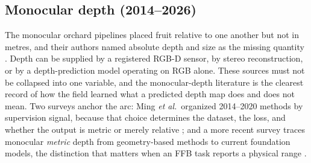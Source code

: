 \subsection{Monocular depth (2014--2026)}

The monocular orchard pipelines placed fruit relative to one another but not in metres, and their authors named absolute depth and size as the missing quantity \cite{ledger_m_9966d81433d61ed3}. Depth can be supplied by a registered RGB-D sensor, by stereo reconstruction, or by a depth-prediction model operating on RGB alone. These sources must not be collapsed into one variable, and the monocular-depth literature is the clearest record of how the field learned what a predicted depth map does and does not mean. Two surveys anchor the arc: Ming \textit{et al.}\ organized 2014--2020 methods by supervision signal, because that choice determines the dataset, the loss, and whether the output is metric or merely relative \cite{ming2021depthsurvey}; and a more recent survey traces monocular \emph{metric} depth from geometry-based methods to current foundation models, the distinction that matters when an FFB task reports a physical range \cite{zhang2025metricdepthsurvey}.

